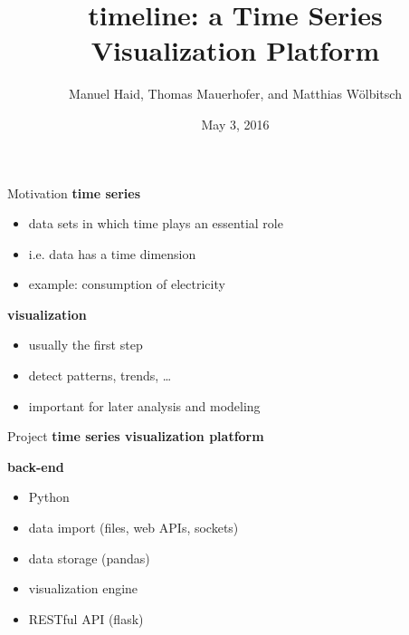 \documentclass{beamer}
\title{timeline: a Time Series Visualization Platform}
\date{May 3, 2016}
\author{Manuel Haid, Thomas Mauerhofer, and Matthias Wölbitsch}
\begin{document}
  \maketitle
  
  
  \begin{frame}{Motivation}   
    \textbf{time series}
    \begin{itemize}
     \item data sets in which time plays an essential role 
     \item i.e. data has a time dimension
     \item example: consumption of electricity
    \end{itemize}
    
    \textbf{visualization}
    \begin{itemize}
     \item usually the first step
     \item detect patterns, trends, \ldots
     \item important for later analysis and modeling 
    \end{itemize}
  \end{frame}
  
  
  \begin{frame}{Project}
    \textbf{time series visualization platform} 
    \hspace{\textheight}
    
    \textbf{back-end}
    \begin{itemize}
     \item Python
     \item data import (files, web APIs, sockets)
     \item data storage (pandas)
     \item visualization engine 
     \item RESTful API (flask)
    \end{itemize}
  \end{frame}
  
\end{document}

